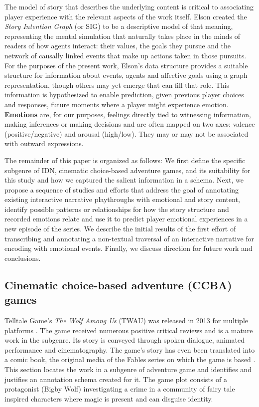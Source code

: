 The model of story that describes the underlying content is critical
to associating player experience with the relevant aspects of the work
itself. Elson created the \emph{Story Intention Graph} (or SIG) to be a
descriptive model of that meaning, representing the mental simulation
that naturally takes place in the minds of readers of how agents
interact: their values, the goals they pursue and the network of
causally linked events that make up actions taken in those
pursuits. For the purposes of the present work, Elson's data structure
provides a suitable structure for information about events, agents and
affective goals using a graph representation, though others may yet
emerge that can fill that role. This information is hypothesized to
enable prediction, given previous player choices and responses, future
moments where a player might experience emotion. \textbf{Emotions} are, for
our purposes, feelings directly tied to witnessing information, making
inferences or making decisions and are often mapped on two axes:
valence (positive/negative) and arousal (high/low). They may or may
not be associated with outward expressions.

The remainder of this paper is organized as follows: We first define
the specific subgenre of IDN, cinematic choice-based adventure games,
and its suitability for this study and how we captured the salient
information in a schema. Next, we propose a sequence of studies and
efforts that address the goal of annotating existing interactive
narrative playthroughs with emotional and story content, identify
possible patterns or relationships for how the story structure and
recorded emotions relate and use it to predict player emotional
experiences in a new episode of the series. We describe the initial
results of the first effort of transcribing and annotating a
non-textual traversal of an interactive narrative for encoding with
emotional events. Finally, we discuss direction for future work and
conclusions.

\subsection{Cinematic choice-based adventure (CCBA) games}
\label{sec:orgheadline2}
Telltale Game's \emph{The Wolf Among Us} (TWAU) was released in 2013 for
multiple platforms \cite{Telltale_Games2013-hz}. The game received
numerous positive critical reviews and is a mature work in the
subgenre. Its story is conveyed through spoken dialogue, animated
performance and cinematography. The game's story has even been
translated into a comic book, the original media of the Fables series
on which the game is based \cite{Sturges2014-ua}. This section locates
the work in a subgenre of adventure game and identifies and justifies
an annotation schema created for it. The game plot consists of a
protagonist (Bigby Wolf) investigating a crime in a community of fairy
tale inspired characters where magic is present and can disguise
identity.

